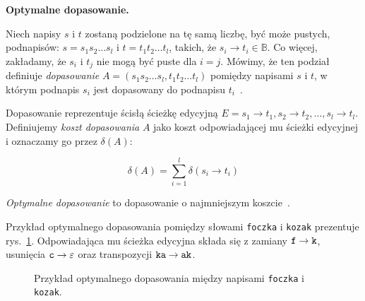 \documentclass{praca1}
\begin{document}
\textbf{Optymalne dopasowanie.} %

Niech napisy $s$ i $t$ zostaną podzielone na tę samą liczbę, być może pustych, podnapisów: $s = s_1 s_2 \ldots s_l$ i $t = t_1 t_2 \ldots t_l$, takich, że $s_i \rightarrow t_i \in \mathbb{B}$. Co więcej, zakładamy, że $s_i$ i $t_j$ nie mogą być puste dla $i = j$. Mówimy, że ten podział definiuje \emph{dopasowanie} $A = (s_1 s_2\ldots s_l, t_1 t_2 \ldots t_l)$ pomiędzy napisami $s$ i $t$, w którym podnapis $s_i$ jest dopasowany do podnapisu $t_i$~\cite{Boytsov2011:indexingmethods}.

Dopasowanie reprezentuje ścisłą ścieżkę edycyjną $E = s_1 \rightarrow t_1, s_2 \rightarrow t_2, \ldots, s_l \rightarrow t_l$. Definiujemy \emph{koszt dopasowania} $A$ jako koszt odpowiadającej mu ścieżki edycyjnej i oznaczamy go przez $\delta(A)$:

\begin{equation}
\label{eq:003}
\delta(A) = \sum\limits_{i = 1}^{l} \delta(s_i \rightarrow t_i)
\end{equation}

\emph{Optymalne dopasowanie} to dopasowanie o najmniejszym koszcie~\cite{Boytsov2011:indexingmethods}.


\begin{example}
Przykład optymalnego dopasowania pomiędzy słowami \verb|foczka| i \verb|kozak| prezentuje rys.~\ref{rys:001}. Odpowiadająca mu ścieżka edycyjna składa się z zamiany $\verb|f| \rightarrow \verb|k|$, usunięcia $\verb|c| \rightarrow \varepsilon$ oraz transpozycji $\verb|ka| \rightarrow \verb|ak|$.
\end{example}

\begin{figure}[width=80pt]
\centering
{}
\cprotect\caption{Przykład optymalnego dopasowania między napisami \verb|foczka| i \verb|kozak|.}\label{rys:001}
\end{figure}
\end{document}
